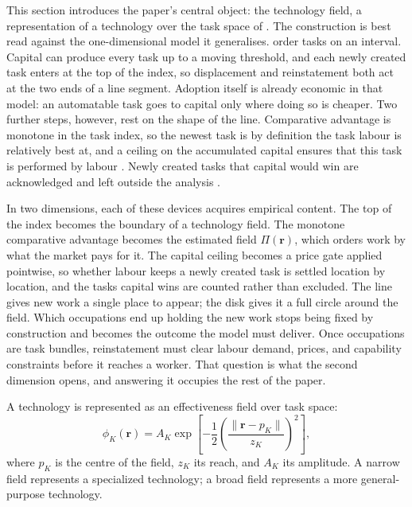 \documentclass[12pt, a4paper]{article}
\begin{document}
This section introduces the paper's central object: the technology
field, a representation of a technology over the task space of
\textcite{storck2026geometry}. The construction is best read against
the one-dimensional model it generalises. \textcite{acemoglu2018race}
order tasks on an interval. Capital can produce every task up to a
moving threshold, and each newly created task enters at the top of the
index, so displacement and reinstatement both act at the two ends of a
line segment. Adoption itself is already economic in that model: an
automatable task goes to capital only where doing so is cheaper. Two
further steps, however, rest on the shape of the line. Comparative
advantage is monotone in the task index, so the newest task is by
definition the task labour is relatively best at, and a ceiling on the
accumulated capital ensures that this task is performed by labour
\parencite{acemoglu2018race}. Newly created tasks that capital would
win are acknowledged and left outside the analysis
\parencite{acemoglu2019automation}.

In two dimensions, each of these devices acquires empirical content.
The top of the index becomes the boundary of a technology field. The
monotone comparative advantage becomes the estimated field
$\Pi(\mathbf{r})$, which orders work by what the market pays for it.
The capital ceiling becomes a price gate applied pointwise, so whether
labour keeps a newly created task is settled location by location, and
the tasks capital wins are counted rather than excluded. The line
gives new work a single place to appear; the disk gives it a
full circle around the field. Which occupations end up holding the new
work stops being fixed by construction and becomes the outcome the
model must deliver. Once occupations are task bundles, reinstatement
must clear labour demand, prices, and capability constraints before it
reaches a worker. That question is what the second dimension opens,
and answering it occupies the rest of the paper.

A technology is represented as an effectiveness field over task space:
\begin{equation}
  \phi_K(\mathbf{r})
  =
  A_K
  \exp
  \left[
    -
    \frac{1}{2}
    \left(
      \frac{\|\mathbf{r}-p_K\|}{z_K}
    \right)^2
  \right],
  \label{eq:phi-K}
\end{equation}
where $p_K$ is the centre of the field, $z_K$ its reach, and $A_K$ its
amplitude. A narrow field represents a specialized technology; a broad
field represents a more general-purpose technology.
\end{document}
